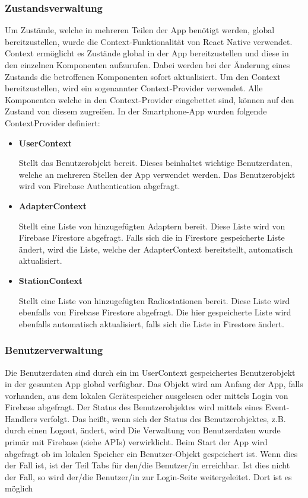 \documentclass[11pt, twoside]{article}
\begin{document}
\subsubsection{Zustandsverwaltung}
Um Zustände, welche in mehreren Teilen der App benötigt werden, global bereitzustellen, wurde die Context-Funktionalität von React Native verwendet. Context ermöglicht es Zustände global in der App bereitzustellen und diese in den einzelnen Komponenten aufzurufen. Dabei werden bei der Änderung eines Zustands die betroffenen Komponenten sofort aktualisiert. Um den Context bereitzustellen, wird ein sogenannter Context-Provider verwendet. Alle Komponenten welche in den Context-Provider eingebettet sind, können auf den Zustand von diesem zugreifen. \parencite[vgl.][]{noauthor_urlpi23_nodate} \newline
In der Smartphone-App wurden folgende ContextProvider definiert:
\begin{itemize}
	\item \textbf{UserContext}
	\par Stellt das Benutzerobjekt bereit. Dieses beinhaltet wichtige Benutzerdaten, welche an mehreren Stellen der App verwendet werden. Das Benutzerobjekt wird von Firebase Authentication abgefragt.
	\newpage
	\item \textbf{AdapterContext}
	\par Stellt eine Liste von hinzugefügten Adaptern bereit. Diese Liste wird von Firebase Firestore abgefragt. Falls sich die in Firestore gespeicherte Liste ändert, wird die Liste, welche der AdapterContext bereitstellt, automatisch aktualisiert. 
	\item \textbf{StationContext}
	\par Stellt eine Liste von hinzugefügten Radiostationen bereit. Diese Liste wird ebenfalls von Firebase Firestore abgefragt. Die hier gespeicherte Liste wird ebenfalls automatisch aktualisiert, falls sich die Liste in Firestore ändert.
\end{itemize}
\subsubsection{Benutzerverwaltung}
Die Benutzerdaten sind durch ein im UserContext gespeichertes Benutzerobjekt in der gesamten App global verfügbar. Das Objekt wird am Anfang der App, falls vorhanden, aus dem lokalen Gerätespeicher ausgelesen oder mittels Login von Firebase abgefragt. Der Status des Benutzerobjektes wird mittels eines Event-Handlers verfolgt. Das heißt, wenn sich der Status des Benutzerobjektes, z.B. durch einen Logout, ändert, wird 
Die Verwaltung von Benutzerdaten wurde primär mit Firebase (siehe APIs) verwirklicht. Beim Start der App wird abgefragt ob im lokalen Speicher ein Benutzer-Objekt gespeichert ist. Wenn dies der Fall ist, ist der Teil Tabs für den/die Benutzer/in erreichbar. Ist dies nicht der Fall, so wird der/die Benutzer/in zur Login-Seite weitergeleitet. Dort ist es möglich 
\end{document}
